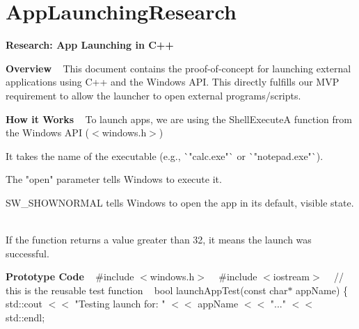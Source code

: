 \chapter{App\+Launching\+Research }
\hypertarget{md__e_1_2_github_2_wheel_time_2notes_2_app_launching_research}{}\label{md__e_1_2_github_2_wheel_time_2notes_2_app_launching_research}
{\bfseries{Research:\+ App Launching in C++}}

{\bfseries{Overview}} ~\newline
 This document contains the proof-\/of-\/concept for launching external applications using C++ and the Windows API. This directly fulfills our MVP requirement to allow the launcher to open external programs/\+scripts.

{\bfseries{How it Works}} ~\newline
 To launch apps, we are using the Shell\+ExecuteA function from the Windows API (\texorpdfstring{$<$}{<}windows.\+h\texorpdfstring{$>$}{>})


\begin{DoxyItemize}
\item It takes the name of the executable (e.\+g., \`{}"{}calc.\+exe"{}\`{} or \`{}"{}notepad.\+exe"{}\`{}). ~\newline

\item The "{}open"{} parameter tells Windows to execute it. ~\newline

\item SW\+\_\+\+SHOWNORMAL tells Windows to open the app in its default, visible state. ~\newline

\item If the function returns a value greater than 32, it means the launch was successful.
\end{DoxyItemize}

{\bfseries{Prototype Code}} ~\newline
 \#include \texorpdfstring{$<$}{<}windows.\+h\texorpdfstring{$>$}{>} ~\newline
 \#include \texorpdfstring{$<$}{<}iostream\texorpdfstring{$>$}{>} ~\newline
 /\+/\+ this is the reusable test function ~\newline
 bool launch\+App\+Test(const char\texorpdfstring{$\ast$}{*} app\+Name) \{ ~\newline
 std::\+cout \texorpdfstring{$<$}{<}\texorpdfstring{$<$}{<} "{}\+Testing launch for:\+ "{} \texorpdfstring{$<$}{<}\texorpdfstring{$<$}{<} app\+Name \texorpdfstring{$<$}{<}\texorpdfstring{$<$}{<} "{}..."{} \texorpdfstring{$<$}{<}\texorpdfstring{$<$}{<} std::\+endl; ~\newline


